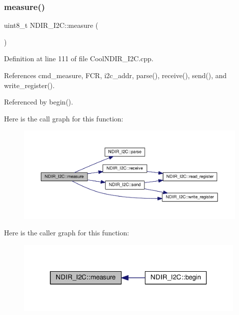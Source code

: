 \subsubsection{\texorpdfstring{measure()}{measure()}}
{\footnotesize\ttfamily uint8\+\_\+t N\+D\+I\+R\+\_\+\+I2\+C\+::measure (\begin{DoxyParamCaption}{ }\end{DoxyParamCaption})}



Definition at line 111 of file Cool\+N\+D\+I\+R\+\_\+\+I2\+C.\+cpp.



References cmd\+\_\+measure, F\+CR, i2c\+\_\+addr, parse(), receive(), send(), and write\+\_\+register().



Referenced by begin().

Here is the call graph for this function\+:\nopagebreak
\begin{figure}[H]
\begin{center}
\leavevmode
\includegraphics[width=350pt]{d6/ddb/class_n_d_i_r___i2_c_ab8f50d38501d498b802b822bd4844ede_cgraph}
\end{center}
\end{figure}
Here is the caller graph for this function\+:\nopagebreak
\begin{figure}[H]
\begin{center}
\leavevmode
\includegraphics[width=315pt]{d6/ddb/class_n_d_i_r___i2_c_ab8f50d38501d498b802b822bd4844ede_icgraph}
\end{center}
\end{figure}
\mbox{\label{class_n_d_i_r___i2_c_aab0c04c2b7d08e99d12af044df179f0c}} 
